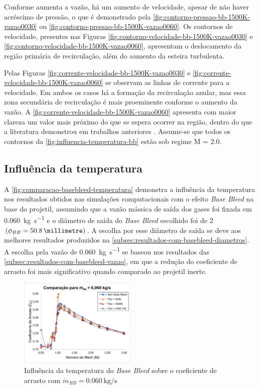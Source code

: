 Conforme aumenta a vazão, há um aumento de velocidade, apesar de não haver acréscimo de pressão, o que é demonstrado pela \autoref{fig:contorno-pressao-bb-1500K-vazao0030} ou \autoref{fig:contorno-pressao-bb-1500K-vazao0060}. Os contornos de velocidade, presentes nas Figuras \ref{fig:contorno-velocidade-bb-1500K-vazao0030} e \ref{fig:contorno-velocidade-bb-1500K-vazao0060}, apresentam o deslocamento da região primária de recirculação, além do aumento da esteira turbulenta. 

Pelas Figuras \ref{fig:corrente-velocidade-bb-1500K-vazao0030} e \ref{fig:corrente-velocidade-bb-1500K-vazao0060} se observam as linhas de corrente para a velocidade. Em ambos os casos há a formação da recirculação anular, mas essa zona secundária de recirculação é mais proeminente conforme o aumento da vazão. A \autoref{fig:corrente-velocidade-bb-1500K-vazao0060} apresenta com maior clareza um valor mais próximo do que se espera ocorrer na região, dentro do que a literatura demonstrou em trabalhos anteriores \cite{Sahu1985,Andersson1976}. Assume-se que todos os contornos da \autoref{fig:influencia-temperatura-bb} estão sob regime M = \num{2,0}.

\subsection{Influência da temperatura}

A \autoref{fig:comparacao-basebleed-temperatura} demonstra a influência da temperatura nos resultados obtidos nas simulações computacionais com o efeito \textit{Base Bleed} na base do projetil, assumindo que a vazão mássica de saída dos gases foi fixada em \qty{0,060}{\kilogram\per\second} e o diâmetro de saída do \textit{Base Bleed} escolhido foi de \qty{2}{\polegada} $\left(\phi_{BB} = \qty{50,8}{\millimetre}\right)$. A escolha por esse diâmetro de saída se deve aos melhores resultados produzidos na \autoref{subsec:resultados-com-basebleed-diametros}. A escolha pela vazão de \qty{0,060}{\kilogram\per\second} se baseou nos resultados das \autoref{subsec:resultados-com-basebleed-vazao}, em que a redução do coeficiente de arrasto foi mais significativo quando comparado ao projetil inerte.

\begin{figure}[!ht]
	\centering
	\includegraphics[width=0.5\textwidth]{cd-combasebleed-vazao006-2pol.png}
	\caption{Influência da temperatura do \textit{Base Bleed} sobre o coeficiente de arrasto com $\Dot{m}_{BB} = \qty{0,060}{\kilogram\per\second}$}
	\label{fig:comparacao-basebleed-temperatura}
\end{figure}

